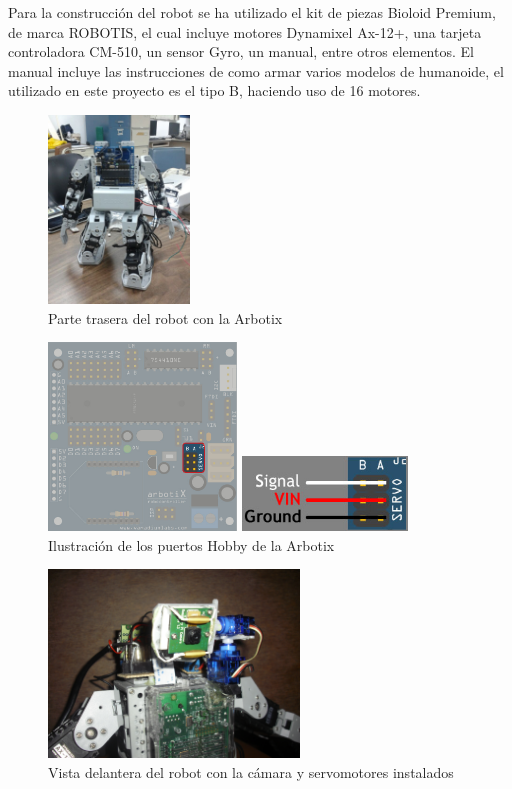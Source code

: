 \documentclass[conference, letterpaper]{IEEEtranMC1}
\begin{document}
Para la construcción del robot se ha utilizado el kit de piezas Bioloid Premium, de marca ROBOTIS, el cual incluye motores Dynamixel Ax-12+, una tarjeta controladora CM-510, un sensor Gyro, un manual, entre otros elementos. El manual incluye las instrucciones de como armar varios modelos de humanoide, el utilizado en este proyecto es el tipo B, haciendo uso de 16 motores. 
\begin{figure}[ht!]
	\centering
		\includegraphics[height=05cm]{arbotixsola.jpg}
	\caption{  Parte trasera del robot con la Arbotix}
	\label{fig:figura1}
\end{figure}
\begin{figure}[ht!]
	\centering
		\includegraphics[height=05cm]{arbotix_hobby_servo.jpg}
		
    	\includegraphics[height=2cm]{arbotix_hobbyservos_lines.jpg}
	\caption{  Ilustración de los puertos Hobby de la Arbotix
}
	\label{fig:figura2}
\end{figure}

\begin{figure}[ht!]
	\centering
		\includegraphics[height=05cm]{CIMG0025.JPG} 	
	\caption{ Vista delantera del robot con la cámara y servomotores instalados}
	\label{fig:figura3}
\end{figure}
\end{document}
